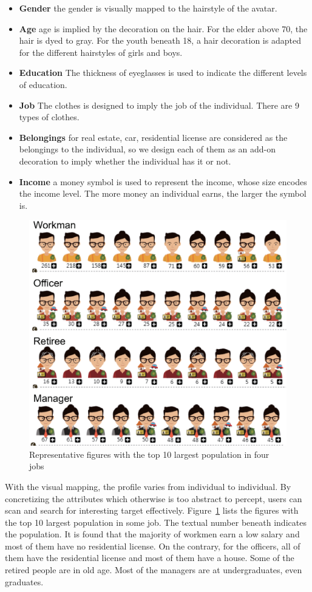 \begin{itemize}
\item \textbf{Gender} the gender is visually mapped to the hairstyle of the avatar.
\item \textbf{Age} age is implied by the decoration on the hair. For the elder above 70, the hair is dyed to gray. For the youth beneath 18, a hair decoration is adapted for the different hairstyles of girls and boys.
\item \textbf{Education} The thickness of eyeglasses is used to indicate the different levels of education.
\item \textbf{Job} The clothes is designed to imply the job of the individual. There are 9 types of clothes.
\item \textbf{Belongings} for real estate, car, residential license are considered as the belongings to the individual, so we design each of them as an add-on decoration to imply whether the individual has it or not.
\item \textbf{Income} a money symbol is used to represent the income, whose size encodes the income level. The more money an individual earns, the larger the symbol is.
\end{itemize}

\begin{figure}[htb!]
 \centering %
 \includegraphics[width=0.6\columnwidth]{pictures/design_example}
 \caption{Representative figures with the top 10 largest population in four jobs}
 \label{fig:div_example}
\end{figure}

With the visual mapping, the profile varies from individual to individual. By concretizing the attributes which otherwise is too abstract to percept, users can scan and search for interesting target effectively. Figure~\ref{fig:div_example} lists the figures with the top 10 largest population in some job. The textual number beneath indicates the population. It is found that the majority of workmen earn a low salary and most of them have no residential license. On the contrary, for the officers, all of them have the residential license and most of them have a house. Some of the retired people are in old age. Most of the managers are at undergraduates, even graduates.




